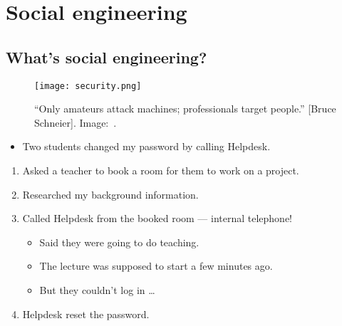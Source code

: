 


\section{Social engineering}

\subsection{What's social engineering?}

\begin{frame}
  \begin{figure}
    \texttt{[image: security.png]}
    \caption{\enquote{Only amateurs attack machines; professionals target 
        people.} [Bruce Schneier].
    Image:~\cite{xkcd538}.}
  \end{figure}
\end{frame}

\begin{frame}
  \begin{example}
    \begin{itemize}
      \item Two students changed my password by calling Helpdesk.
    \end{itemize}

    \pause

    \begin{enumerate}
      \item Asked a teacher to book a room for them to work on a project.
      \item Researched my background information.
      \item Called Helpdesk from the booked room --- internal telephone!
        \begin{itemize}
          \item Said they were going to do teaching.
          \item The lecture was supposed to start a few minutes ago.
          \item But they couldn't log in \dots
        \end{itemize}
      \item Helpdesk reset the password.
    \end{enumerate}
  \end{example}
\end{frame}

